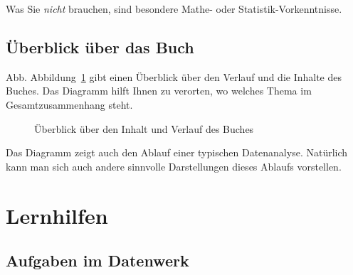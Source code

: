 \documentclass[
  letterpaper,
]{scrbook}
\theoremstyle{definition}
\theoremstyle{definition}
\theoremstyle{definition}
\theoremstyle{remark}
\begin{document}
Was Sie \emph{nicht} brauchen, sind besondere Mathe- oder
Statistik-Vorkenntnisse.

\subsection{Überblick über das
Buch}\label{uxfcberblick-uxfcber-das-buch}

Abb. Abbildung~\ref{fig-ueberblick} gibt einen Überblick über den
Verlauf und die Inhalte des Buches. Das Diagramm hilft Ihnen zu
verorten, wo welches Thema im Gesamtzusammenhang steht.

\begin{figure}


\caption{\label{fig-ueberblick}Überblick über den Inhalt und Verlauf des
Buches}

\end{figure}%

Das Diagramm zeigt auch den Ablauf einer typischen Datenanalyse.
Natürlich kann man sich auch andere sinnvolle Darstellungen dieses
Ablaufs vorstellen.

\section{Lernhilfen}\label{lernhilfen}

\subsection{Aufgaben im Datenwerk}\label{aufgaben-im-datenwerk}
\end{document}
